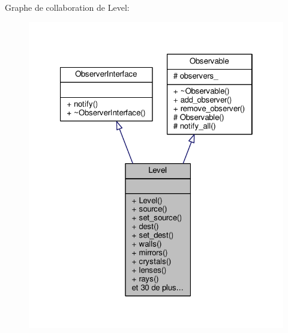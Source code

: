 Graphe de collaboration de Level\+:\nopagebreak
\begin{figure}[H]
\begin{center}
\leavevmode
\includegraphics[width=321pt]{df/dee/classLevel__coll__graph}
\end{center}
\end{figure}
